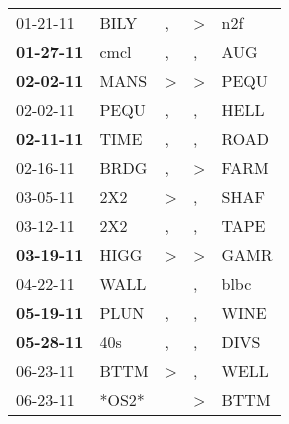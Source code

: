 \begin{supertabular}{p{0.07\textwidth}p{0.06\textwidth}p{0.02\textwidth}p{0.02\textwidth}p{0.06\textwidth}}
          01-21-11\textsuperscript{} &           BILY\textsuperscript{} &                , &     \textgreater &            n2f\textsuperscript{} \\
 \textbf{01-27-11\textsuperscript{}} &           cmcl\textsuperscript{} &                , &                , &            AUG\textsuperscript{} \\
 \textbf{02-02-11\textsuperscript{}} &           MANS\textsuperscript{} &     \textgreater &     \textgreater &           PEQU\textsuperscript{} \\
          02-02-11\textsuperscript{} &           PEQU\textsuperscript{} &                , &                , &           HELL\textsuperscript{} \\
 \textbf{02-11-11\textsuperscript{}} &           TIME\textsuperscript{} &                , &                , &           ROAD\textsuperscript{} \\
          02-16-11\textsuperscript{} &           BRDG\textsuperscript{} &                , &     \textgreater &           FARM\textsuperscript{} \\
          03-05-11\textsuperscript{} &            2X2\textsuperscript{} &     \textgreater &                , &           SHAF\textsuperscript{} \\
          03-12-11\textsuperscript{} &            2X2\textsuperscript{} &                , &                , &           TAPE\textsuperscript{} \\
 \textbf{03-19-11\textsuperscript{}} &           HIGG\textsuperscript{} &     \textgreater &     \textgreater &           GAMR\textsuperscript{} \\
          04-22-11\textsuperscript{} &           WALL\textsuperscript{} &                  &                , &           blbc\textsuperscript{} \\
 \textbf{05-19-11\textsuperscript{}} &           PLUN\textsuperscript{} &                , &                , &           WINE\textsuperscript{} \\
 \textbf{05-28-11\textsuperscript{}} &            40s\textsuperscript{} &                , &                , &           DIVS\textsuperscript{} \\
          06-23-11\textsuperscript{} &           BTTM\textsuperscript{} &     \textgreater &                , &           WELL\textsuperscript{} \\
          06-23-11\textsuperscript{} &                            *OS2* &                  &     \textgreater &           BTTM\textsuperscript{} \\

\end{supertabular}
